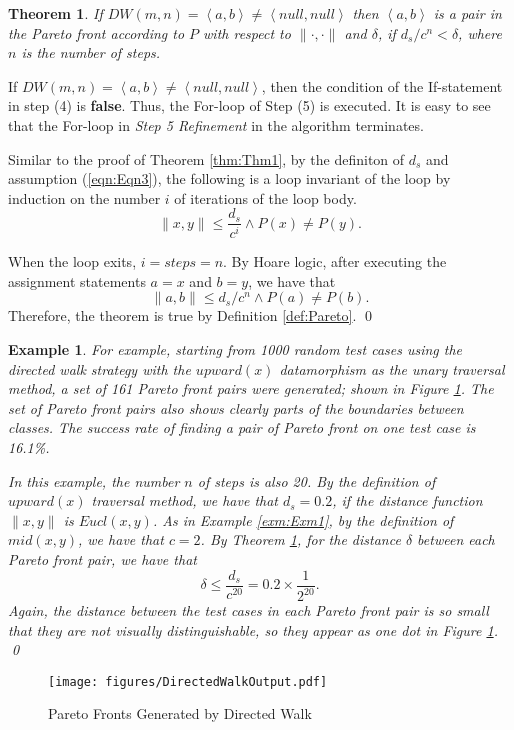 \documentclass[preprint,1p,authoryear,times]{elsarticle}
\newtheorem{Theorem} {Theorem}
\newtheorem{Example}{Example}
\begin{document}
\begin{Theorem}\label{thm:Thm2}
If $DW(m,n)=\left< a, b \right> \neq \left< null, null \right>$ then $\left< a ,b \right>$ is a pair in the Pareto front according to $P$ with respect to $\|\cdot,\cdot\|$ and  $\delta$, if $d_s/c^n < \delta$, where $n$ is the number of steps. 
\end{Theorem}
If $DW(m,n)=\left<a, b \right> \neq \left< null, null \right>$, then the condition of the If-statement in step (4) is \textbf{false}. Thus, the For-loop of Step (5) is executed. It is easy to see that the For-loop in \emph{Step 5 Refinement} in the algorithm terminates. 

Similar to the proof of Theorem \ref{thm:Thm1}, by the definiton of $d_s$ and assumption (\ref{eqn:Eqn3}), the following is a loop invariant of the loop by induction on the number $i$ of iterations of the loop body. 
\[\|x,y\| \leq \frac{d_s}{c^i} \wedge P(x) \neq P(y).\] 

When the loop exits, $i = steps=n$. By Hoare logic, after executing the assignment statements $a=x$ and $b=y$, we have that 
\[\|a,b\| \leq d_s/c^n \wedge P(a) \neq P(b).\] 
Therefore, the theorem is true by Definition \ref{def:Pareto}. 
\qed

\begin{Example}\label{exm:Exm2}
For example, starting from 1000 random test cases using the directed walk strategy with the $upward(x)$ datamorphism as the unary traversal method, a set of 161 Pareto front pairs were generated; shown in Figure \ref{fig:DirectedWalkInputAndResult}. The set of Pareto front pairs also shows clearly parts of the boundaries between classes. The success rate of finding a pair of Pareto front on one test case is 16.1\%. 

In this example, the number $n$ of steps is also 20. By the definition of $upward(x)$ traversal method, we have that $d_s=0.2$, if the distance function $\|x,y\|$ is $Eucl(x,y)$. As in Example \ref{exm:Exm1}, by the definition of $mid(x,y)$, we have that $c=2$. By Theorem \ref{thm:Thm2}, for the distance $\delta$ between each Pareto front pair, we have that 
\[\delta \leq \frac{d_s}{c^{20}} = 0.2 \times \frac{1}{2^{20}}.\] 
Again, the distance between the test cases in each Pareto front pair is so small that they are not visually distinguishable, so they appear as one dot in Figure \ref{fig:DirectedWalkInputAndResult}.
\qed
\end{Example}

 \begin{figure}[htbp]
	\centering
	\texttt{[image: figures/DirectedWalkOutput.pdf]}\\
	\caption{Pareto Fronts Generated by Directed Walk}
	\label{fig:DirectedWalkInputAndResult}
\end{figure}
\end{document}
